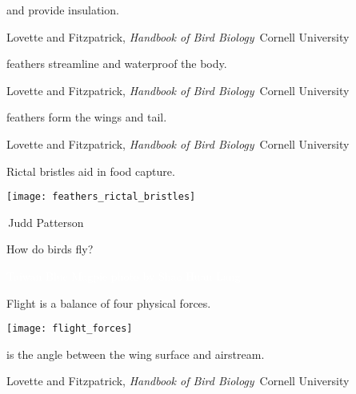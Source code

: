 \documentclass[t]{beamer}
\begin{document}
%
{
\begin{frame}[t,plain]{ and  provide insulation.}

\vfilll

\tiny \hfill Lovette and Fitzpatrick, \textit{Handbook of Bird Biology} \textcopyright\,Cornell University

\end{frame}
}
%
{
\begin{frame}[t,plain]{ feathers streamline and waterproof the body.}

\vfilll

\tiny \hfill Lovette and Fitzpatrick, \textit{Handbook of Bird Biology} \textcopyright\,Cornell University

\end{frame}
}
%
{
\begin{frame}[t,plain]{ feathers form the wings and tail.}

\vfilll

\tiny \hfill Lovette and Fitzpatrick, \textit{Handbook of Bird Biology} \textcopyright\,Cornell University

\end{frame}
}
%
\begin{frame}[t,plain]{Rictal bristles aid in food capture.}

\centering

\texttt{[image: feathers\_rictal\_bristles]}

\vfilll

\tiny \hfill \textcopyright\,Judd Patterson
\end{frame}
%
{
\begin{frame}[t,plain]{How do birds fly?}

\vfilll

\tiny \hfill\textcolor{white}{Taiwan Blue Magpie photo by Shao Huan Lang}

\end{frame}
}
%
\begin{frame}[t,plain]{Flight is a balance of four physical forces.}
\centering

\texttt{[image: flight\_forces]}
\end{frame}
%
{
\begin{frame}[t,plain]{ is the angle between the wing surface and airstream.}

\vfilll

\tiny \hfill Lovette and Fitzpatrick, \textit{Handbook of Bird Biology} \textcopyright\,Cornell University

\end{frame}
}
\end{document}
